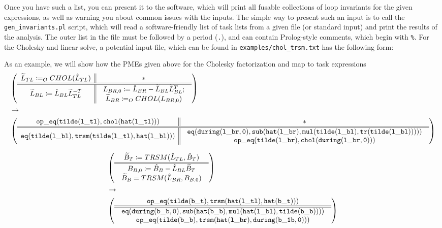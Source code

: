 \documentclass[12pt,letterpaper]{article}
\begin{document}
Once you have such a list, you can present it to the software, which will print all fusable collections of loop invariants for the given expressions, as well as warning you about common issues with the inputs.
The simple way to present such an input is to call the \texttt{gen\_invariants.pl} script, which will read a software-friendly list of task lists from a given file (or standard input) and print the results of the analysis.
The outer list in the file must be followed by a period (\texttt{.}), and can contain Prolog-style comments, which begin with \texttt{\%}.
For the Cholesky and linear solve, a potential input file, which can be found in \texttt{examples/chol\_trsm.txt} has the following form:

As an example, we will show how the PMEs given above for the Cholesky factorization and map to task expressions
{\scriptsize%
  \setlength{\abovedisplayskip}{6pt}
  \setlength{\belowdisplayskip}{\abovedisplayskip}
  \setlength{\abovedisplayshortskip}{0pt}
  \setlength{\belowdisplayshortskip}{3pt}
\begin{align*}
  &\left( \begin{array}{c || c} \widetilde{L}_{TL} \coloneqq_O CHOL(\hat{L}_{TL}) & * \\ \hline \hline \widetilde{L}_{BL} \coloneqq \hat{L}_{BL}\widetilde{L}_{TL}^{-T} & \begin{array}{c}
     L_{BR, 0} \coloneqq \hat{L}_{BR} - \widetilde{L}_{BL}\widetilde{L}_{BL}^T;\\
     \widetilde{L}_{BR} \coloneqq_O CHOL(L_{BR, 0})
   \end{array} \end{array} \right)\\
  &\to\\
  &\left( \begin{array}{c || c} \mathtt{op\_eq(tilde(l\_tl), chol(hat(l\_tl)))} & * \\ \hline \hline \mathtt{eq(tilde(l\_bl), trsm(tilde(l\_tl), hat(l\_bl)))} & \begin{array}{c}
       \mathtt{eq(during(l\_br, 0), sub(hat(l\_br), mul(tilde(l\_bl), tr(tilde(l\_bl)))))}\\
       \mathtt{op\_eq(tilde(l\_br), chol(during(l\_br, 0)))}\\
     \end{array} \end{array} \right)
\end{align*}%
}%

\begin{align*}
  &\left( \begin{array}{c} \widetilde{B}_T \coloneqq TRSM(\hat{L}_{TL}, \hat{B}_T) \\ \hline \hline \begin{array}{c}
     B_{B, 0} \coloneqq \hat{B}_B - \hat{L}_{BL}\widetilde{B}_T\\
     \widetilde{B}_B = TRSM(\hat{L}_{BR}, B_{B, 0})
   \end{array} \end{array} \right)\\
 &\to\\
  &\left( \begin{array}{c} \mathtt{op\_eq(tilde(b\_t), trsm(hat(l\_tl), hat(b\_t)))} \\ \hline \hline \begin{array}{c}
     \mathtt{eq(during(b\_b, 0), sub(hat(b\_b), mul(hat(l\_bl), tilde(b\_b))))}\\
     \mathtt{op\_eq(tilde(b\_b), trsm(hat(l\_br), during(b\_1b, 0)))}
  \end{array} \end{array} \right)
\end{align*}
\end{document}
